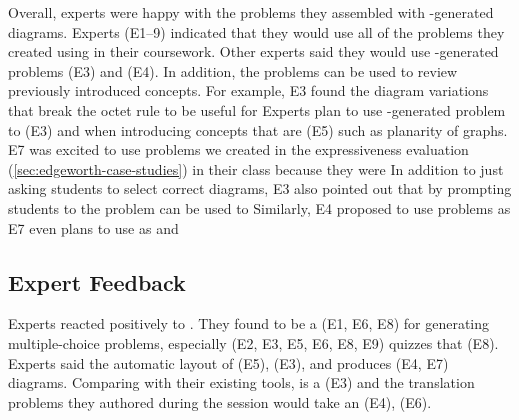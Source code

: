 Overall, experts were happy with the problems they assembled with \Edgeworth-generated diagrams. Experts (E1--9) indicated that they would use all of the problems they created using \Edgeworth in their coursework. Other experts said they would use \Edgeworth-generated problems  (E3) and  (E4). In addition, the problems can be used to review previously introduced concepts. For example, E3 found the diagram variations that break the octet rule to be useful for  Experts plan to use \Edgeworth-generated problem to  (E3) and when introducing concepts that are  (E5) such as planarity of graphs. E7 was excited to use problems we created in the expressiveness evaluation (\cref{sec:edgeworth-case-studies}) in their class because they were  In addition to just asking students to select correct diagrams, E3 also pointed out that by prompting students to  the problem can be used to  Similarly, E4 proposed to use \Edgeworth problems as  E7 even plans to use \Edgeworth as  and  

\subsection{Expert Feedback}

Experts reacted positively to \Edgeworth. They found \Edgeworth to be a  (E1, E6, E8) for generating multiple-choice problems, especially  (E2, E3, E5, E6, E8, E9) quizzes that  (E8). Experts said the automatic layout of \Edgeworth {} (E5),  (E3), and produces  (E4, E7) diagrams. Comparing with their existing tools, \Edgeworth is a  (E3) and the translation problems they authored during the session would take an  (E4),  (E6).

